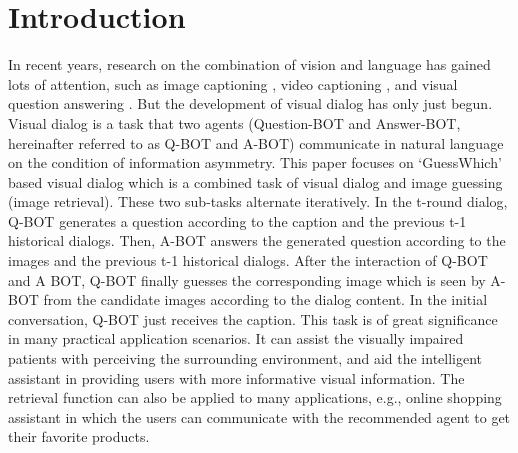 \documentclass[review]{elsarticle}
\begin{document}
	\section{Introduction}
	In recent years, research on the combination of vision and language has gained lots of attention, such as image captioning \cite{gao2019hierarchical, DBLP:conf/cvpr/VinyalsTBE15}, video captioning \cite{song2018deterministic, venugopalan2015sequence}, and visual question answering \cite{DBLP:journals/pami/DonahueHRVGSD17, DBLP:conf/iccv/AntolALMBZP15, DBLP:journals/cviu/WuTWSDH17, li2019beyond}. 
	But the development of visual dialog has only just begun. Visual dialog is a task that two agents (Question-BOT and Answer-BOT, hereinafter referred to as Q-BOT and A-BOT) communicate in natural language on the condition of information asymmetry. This paper focuses on `GuessWhich' based visual dialog which is a combined task of visual dialog and image guessing (image retrieval). These two sub-tasks alternate iteratively.
	In the t-round dialog, Q-BOT generates a question according to the caption and the previous t-1 historical dialogs. Then, A-BOT answers the generated question according to the images and the previous t-1 historical dialogs. After the interaction of Q-BOT and A BOT, Q-BOT finally guesses the corresponding image which is seen by A-BOT from the candidate images according to the dialog content. In the initial conversation, Q-BOT just receives the caption.
	This task is of great significance in many practical application scenarios. 
	It can assist the visually impaired patients with perceiving the surrounding environment, and aid the intelligent assistant in providing users with more informative visual information. The retrieval function can also be applied to many applications, e.g., online shopping assistant in which the users can communicate with the recommended agent to get their favorite products. 
	
\end{document}
